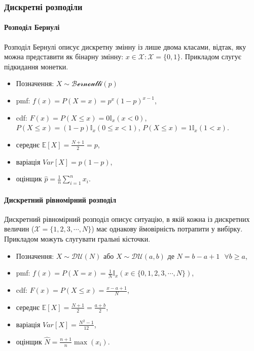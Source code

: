 \documentclass[
  11pt,
]{book}
\begin{document}
\subsubsection{Дискретні
розподіли}\label{ux434ux438ux441ux43aux440ux435ux442ux43dux456-ux440ux43eux437ux43fux43eux434ux456ux43bux438}

\paragraph{Розподіл
Бернулі}\label{ux440ux43eux437ux43fux43eux434ux456ux43b-ux431ux435ux440ux43dux443ux43bux456}

Розподіл Бернулі описує дискретну змінну із лише двома класами, відтак,
яку можна представити як бінарну змінну:
\(x \in \mathcal{X}: \mathcal{X} = \{0, 1\}\). Прикладом слугує
підкидання монетки.

\begin{itemize}
\item
  Позначення: \(X \sim \mathcal{Bernoulli}(p)\)
\item
  pmf: \(f(x) = P(X = x) = p^x (1-p)^{x-1}\),
\item
  cdf: \(F(x) = P(X \leq x) = 0 \mathbb{I}_x(x < 0)\),
  \(P(X \leq x) = (1 - p) \mathbb{I}_x(0 \leq x < 1)\),
  \(P(X \leq x) = 1 \mathbb{I}_x(1 < x)\).
\item
  середнє \(\mathbb{E} [X] = \frac{N+1}{2} = p\),
\item
  варіація \(Var[X] = p(1 - p)\),
\item
  оцінщик \(\hat{p} = \frac{1}{n} \sum \limits_{i=1}^{n}x_i\).
\end{itemize}

\paragraph{Дискретний рівномірний
розподіл}\label{ux434ux438ux441ux43aux440ux435ux442ux43dux438ux439-ux440ux456ux432ux43dux43eux43cux456ux440ux43dux438ux439-ux440ux43eux437ux43fux43eux434ux456ux43b}

Дискретний рівномірний розподіл описує ситуацію, в якій кожна із
дискретних величин (\(\mathcal{X} = \{1, 2, 3, \cdots, N\}\)) має
однакову ймовірність потрапити у вибірку. Прикладом можуть слугувати
гральні кісточки.

\begin{itemize}
\item
  Позначення: \(X \sim \mathcal{DU}(N)\) або
  \(X \sim \mathcal{DU}(a, b)\) де
  \(N = b - a + 1 \text { } \forall b \geq a\),
\item
  pmf:
  \(f(x) = P(X = x) = \frac{1}{N} \mathbb{I}_x (x \in \{0, 1, 2, 3, \cdots, N\})\),
\item
  cdf: \(F(x) = P(X \leq x) = \frac{x - a + 1}{N}\),
\item
  середнє \(\mathbb{E} [X] = \frac{N+1}{2} = \frac{a+b}{2}\),
\item
  варіація \(Var[X] = \frac{N^2 - 1}{12}\),
\item
  оцінщик \(\hat{N} = \frac{n+1}{n} \max (x_i)\).
\end{itemize}
\end{document}
